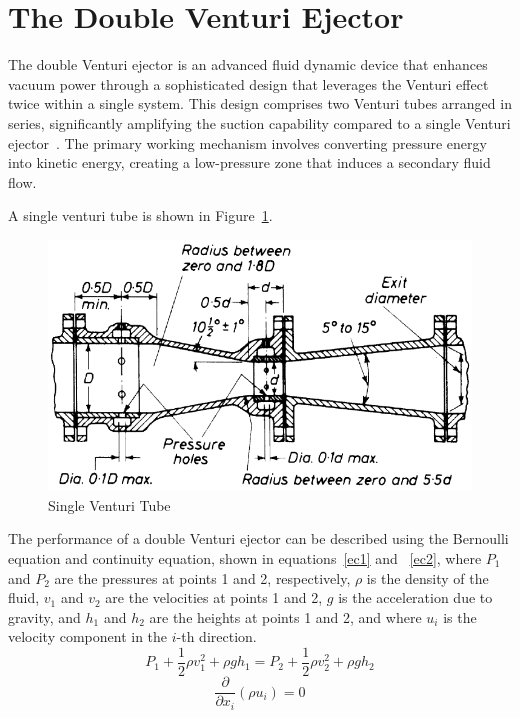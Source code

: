  
\section{The Double Venturi Ejector}

The double Venturi ejector is an advanced fluid dynamic device that enhances vacuum power through a sophisticated design that leverages the Venturi effect twice within a single system. This design comprises two Venturi tubes arranged in series, significantly amplifying the suction capability compared to a single Venturi ejector~\cite{Xu2016}. The primary working mechanism involves converting pressure energy into kinetic energy, creating a low-pressure zone that induces a secondary fluid flow. 

A single venturi tube is shown in Figure~\ref{singlevent}.
\begin{figure}[H]
    \centering
    \includegraphics[width=0.5\linewidth]{FIGURES/singlevent.png}
    \caption{Single Venturi Tube~\cite{FOWLES201031}}
    \label{singlevent}
\end{figure}

The performance of a double Venturi ejector can be described using the Bernoulli equation and continuity equation, shown in equations~\ref{ec1} and ~\ref{ec2}, where $P_{1}$ and $P_{2}$ are the pressures at points 1 and 2, respectively, $\rho$ is the density of the fluid, $v_{1}$ and $v_{2}$ are the velocities at points 1 and 2, $g$ is the acceleration due to gravity, and $h_{1}$ and $h_{2}$ are the heights at points 1 and 2, and where  $u_i$ is the velocity component in the $i$-th direction.
\begin{equation}
    P_{1} + \frac{1}{2}\rho v_{1}^2 + \rho gh_{1} = P_{2} + \frac{1}{2}\rho v_{2}^2 + \rho gh_{2}
    \label{ec1}
\end{equation}
\begin{equation}
    \frac{\partial}{\partial x_i}(\rho u_i) = 0
    \label{ec2}
\end{equation}

